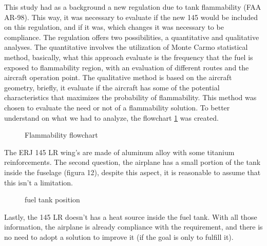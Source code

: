 ﻿This study had as a background a new regulation due to tank flammability (FAA AR-98). This way, it was necessary to evaluate if the new 145 would be included on this regulation, and if it was, which changes it was necessary to be compliance.
The regulation offers two possibilities, a quantitative and qualitative analyses. The quantitative involves the utilization of Monte Carmo statistical method, basically, what this approach evaluate is the frequency that the fuel is exposed to flammability region, with an evaluation of different routes and the aircraft operation point.
The qualitative method is based on the aircraft geometry, briefly, it evaluate if the aircraft has some of the potential characteristics that maximizes the probability of flammability.  This method was chosen to evaluate the need or not of a flammability solution. To better understand on what we had to analyze, the flowchart \ref{fig:Flammabilityflowchart} was created.

\begin{figure}[H] %
\caption{Flammability flowchart}
\label{fig:Flammabilityflowchart}
\end{figure}

The ERJ 145 LR wing's are made of aluminum alloy with some titanium reinforcements. The second question, the airplane has a small portion of the tank inside the fuselage (figura 12), despite this aspect, it is reasonable to assume that this isn't a limitation.

\begin{figure}[H] %
\caption{fuel tank position}
\label{fig:fueltankposition}
\end{figure}

Lastly, the 145 LR doesn't has a heat source inside the fuel tank. With all those information, the airplane is already compliance with the requirement, and there is no need to adopt a solution to improve it (if the goal is only to fulfill it). 